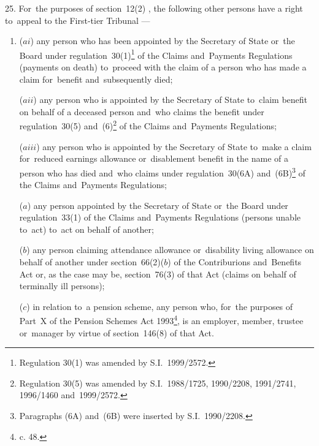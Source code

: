 \documentclass[12pt,a4paper]{article}
\begin{document}
25.  For~the purposes of 
section~12(2)%
, the following other persons have a right to~appeal to 
the First-tier Tribunal%
—
\begin{enumerate}\item[]
($ai$) any person who has been appointed by the Secretary of State or~the Board under regulation~30(1)\footnote{Regulation 30(1) was amended by S.I.~1999/2572.} of the Claims and~Payments Regulations (payments on death) to~proceed with the claim of a person who has made a claim for~benefit and~subsequently died;

($aii$) any person who is appointed by the Secretary of State to~claim benefit on behalf of a deceased person and~who claims the benefit under regulation~30(5) and~(6)\footnote{Regulation 30(5) was amended by S.I.~1988/1725, 1990/2208, 1991/2741, 1996/1460 and~1999/2572.} of the Claims and~Payments Regulations;

($aiii$) any person who is appointed by the Secretary of State to~make a claim for~reduced earnings allowance or~disablement benefit in the name of a person who has died and~who claims under regulation~30(6A) and~(6B)\footnote{Paragraphs (6A) and~(6B) were inserted by S.I.~1990/2208.} of the Claims and~Payments Regulations;

($a$) any person appointed by the Secretary of State 
or~the Board  %
under regulation~33(1) of the Claims and~Payments Regulations (persons unable to~act) to~act on behalf of another;

($b$) any person claiming attendance allowance or~disability living allowance on behalf of another under section~66(2)($b$) of the Contriburions and~Benefits Act or, as the case may be, section~76(3) of that Act (claims on behalf of terminally ill persons);

($c$) in relation to~a pension scheme, any person who, for~the purposes of Part~X of the Pension Schemes Act 1993\footnote{ c. 48.}, is an employer, member, trustee or~manager by virtue of section~146(8) of that Act.
\end{enumerate}

\end{document}
